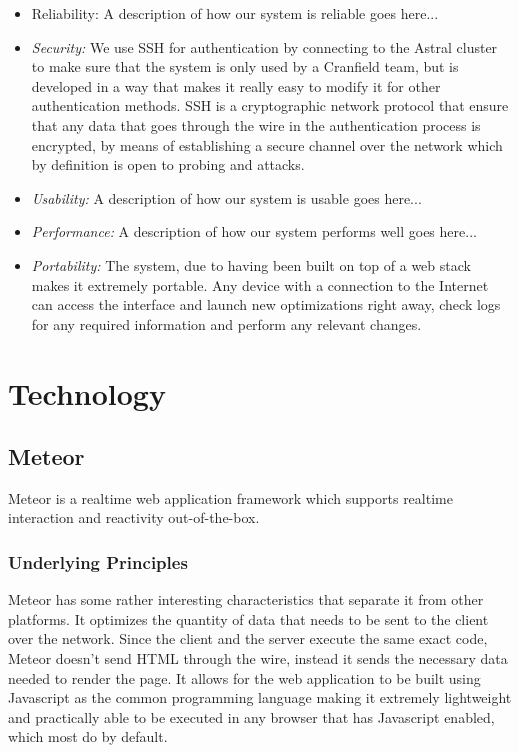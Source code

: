 \documentclass{article}
\begin{document}
\begin{itemize}
   \item  Reliability: A description of  how our system is reliable goes here...

   \item  \textit{Security:} We use SSH for authentication by connecting to the Astral cluster to make sure that the system is only used by a Cranfield team, but is developed in a way that makes it really easy to modify it for other authentication methods. SSH is a cryptographic network protocol that ensure that any data that goes through the wire in the authentication process is encrypted, by means of establishing a secure channel over the network which by definition is open to probing and attacks.

   \item  \textit{Usability:} A description of  how our system is usable goes here...

   \item  \textit{Performance:} A description of  how our system performs well goes here...

   \item  \textit{Portability:} The system, due to having been built on top of a web stack makes it extremely portable. Any device with a connection to the Internet can access the interface and launch new optimizations right away, check logs for any required information and perform any relevant changes.

\end{itemize}



\section{Technology}

\subsection{Meteor}

Meteor is a realtime web application framework which supports realtime interaction and reactivity out-of-the-box.

\subsubsection{Underlying Principles}

Meteor has some rather interesting characteristics that separate it from other platforms. It optimizes the quantity of data that needs to be sent to the client over the network. Since the client and the server execute the same exact code, Meteor doesn't send HTML through the wire, instead it sends the necessary data needed to render the page. It allows for the web application to be built using Javascript as the common programming language making it extremely lightweight and practically able to be executed in any browser that has Javascript enabled, which most do by default.\\\par
\end{document}
